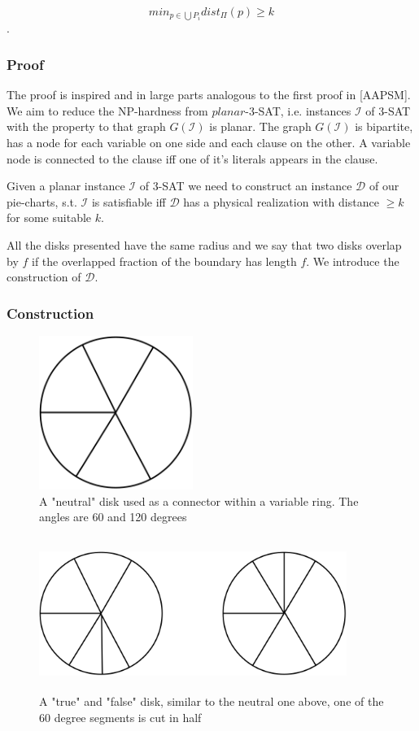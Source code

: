 \documentclass[a4paper,11pt]{article}
\begin{document}
\[min_{p\in\bigcup P_i} dist_\Pi(p) \geq k\].

\subsubsection{Proof}
The proof is inspired and in large parts analogous to the first proof in [AAPSM].
We aim to reduce the NP-hardness from $planar$-3-SAT, i.e. instances $\mathcal{I}$ of 3-SAT with the property to that graph $G(\mathcal{I})$ is planar.
The graph $G(\mathcal{I})$ is bipartite, has a node for each variable on one side and each clause on the other. A variable node is connected to the clause iff one of it's literals appears in the clause.

Given a planar instance $\mathcal{I}$ of 3-SAT we need to construct an instance $\mathcal{D}$ of our pie-charts, s.t. $\mathcal{I}$ is satisfiable iff $\mathcal{D}$ has a physical realization with distance $\geq k$ for some suitable $k$.

All the disks presented have the same radius and we say that two disks overlap by $f$ if the overlapped fraction of the boundary has length $f$. We introduce the construction of $\mathcal{D}$.

\subsubsection{Construction}
\begin{figure}[h]
\centering
\includegraphics[width=5cm, height=5cm]{assets/np-hardness/neutral.png}
\caption{A "neutral" disk used as a connector within a variable ring. The angles are 60 and 120 degrees}
\end{figure}

\begin{figure}[h]
\centering
\includegraphics[width=10cm, height=5cm]{assets/np-hardness/true_false.png}
\caption{A "true" and "false" disk, similar to the neutral one above, one of the 60 degree segments is cut in half}
\end{figure}
\end{document}

